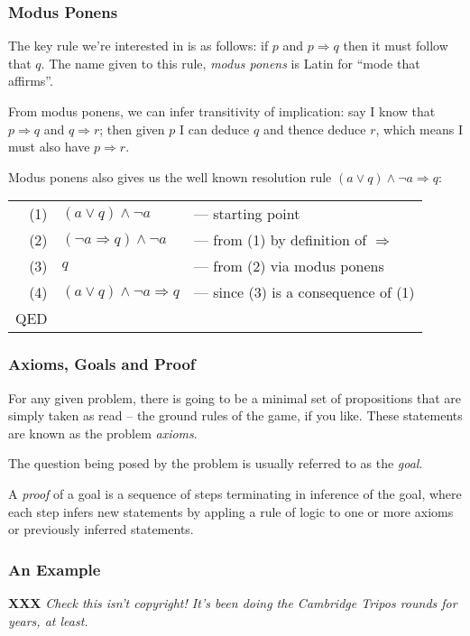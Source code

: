\documentclass[a4paper,11pt,notitlepage,onecolumn]{article}
\newcommand{\XXX}[1]%
{{\small\textbf{XXX} \emph{#1}}}
\newcommand{\Not}[1]%
{\neg{}#1}
\newcommand{\Conj}%
{\wedge}
\newcommand{\Disj}%
{\vee}
\newcommand{\Imp}%
{\Rightarrow}
\begin{document}
\subsubsection{Modus Ponens}

The key rule we're interested in is as follows: if $p$ and $p \Imp q$
then it must follow that $q$.  The name given to this rule, \emph{modus
ponens} is Latin for ``mode that affirms''.

From modus ponens, we can infer transitivity of implication: say I know
that $p \Imp q$ and $q \Imp r$; then given $p$ I can deduce $q$ and
thence deduce $r$, which means I must also have $p \Imp r$.

Modus ponens also gives us the well known resolution rule
$(a \Disj q) \Conj \Not{a} \Imp q$:
\begin{tabular}{rll}
(1) & $(a \Disj q) \Conj \Not{a}$
& --- starting point \\
(2) & $(\Not{a} \Imp q) \Conj \Not{a}$
& --- from (1) by definition of $\Imp$ \\
(3) & $q$
& --- from (2) via modus ponens \\
(4) & $(a \Disj q) \Conj \Not{a} \Imp q$
& --- since (3) is a consequence of (1) \\
QED \\
\end{tabular}

\subsubsection{Axioms, Goals and Proof}

For any given problem, there is going to be a minimal set of
propositions that are simply taken as read -- the ground rules of the
game, if you like.  These statements are known as the problem
\emph{axioms}.

The question being posed by the problem is usually referred to as the
\emph{goal}.

A \emph{proof} of a goal is a sequence of steps terminating in inference
of the goal, where each step infers new statements by appling a rule of
logic to one or more axioms or previously inferred statements.

\subsubsection{An Example}

\XXX{Check this isn't copyright!  It's been doing the Cambridge Tripos
rounds for years, at least.}
\end{document}

